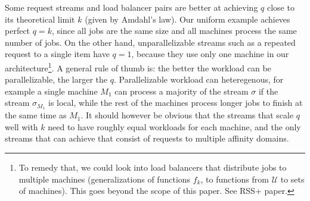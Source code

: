 Some request streams and load balancer pairs are better at achieving $q$ close to its theoretical limit $k$ (given by Amdahl's law). Our uniform example achieves perfect $q=k$, since all jobs are the same size and all machines process the same number of jobs. On the other hand, unparallelizable streams such as a repeated request to a single item have $q=1$, because they use only one machine in our architecture\footnote{To remedy that, we could look into load balancers that distribute jobs to multiple machines (generalizations of functions $f_k$, to functions from $\mathcal{U}$ to sets of machines). This goes beyond the scope of this paper. See RSS+ paper.}.
A general rule of thumb is: the better the workload can be parallelizable, the larger the $q$. Parallelizable workload can heteregenous, for example a single machine $M_1$ can process a majority of the stream $\sigma$ if the stream $\sigma_{M_1}$ is local, while the rest of the machines process longer jobs to finish at the same time as $M_1$.
It should however be obvious that the streams that scale $q$ well with $k$ need to have roughly equal workloads for each machine, and the only streams that can achieve that consist of requests to multiple affinity domains.





  




